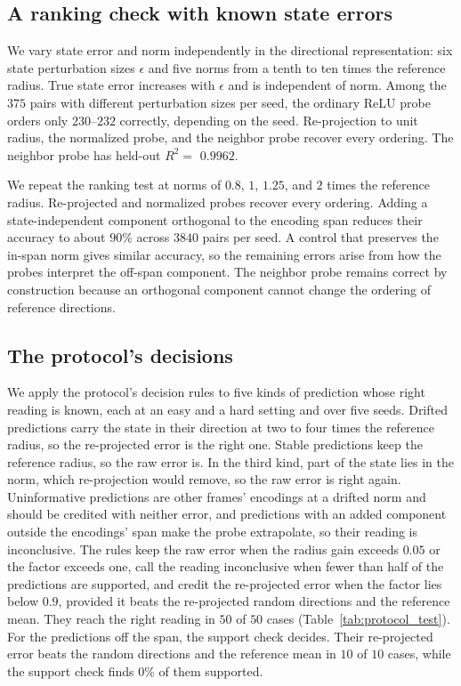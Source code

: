 \subsection{A ranking check with known state errors}
\label{app:synthetic_ranking}
We vary state error and norm independently in the directional representation: six state perturbation sizes $\epsilon$ and five norms from a tenth to ten times the reference radius. True state error increases with $\epsilon$ and is independent of norm. Among the $375$ pairs with different perturbation sizes per seed, the ordinary ReLU probe orders only $230$--$232$ correctly, depending on the seed. Re-projection to unit radius, the normalized probe, and the neighbor probe recover every ordering. The neighbor probe has held-out $R^2=$ $0.9962$.

We repeat the ranking test at norms of $0.8$, $1$, $1.25$, and $2$ times the reference radius. Re-projected and normalized probes recover every ordering. Adding a state-independent component orthogonal to the encoding span reduces their accuracy to about $90$\% across $3840$ pairs per seed. A control that preserves the in-span norm gives similar accuracy, so the remaining errors arise from how the probes interpret the off-span component. The neighbor probe remains correct by construction because an orthogonal component cannot change the ordering of reference directions.

\subsection{The protocol's decisions}
\label{app:protocol_test}
We apply the protocol's decision rules to five kinds of prediction whose right reading is known, each at an easy and a hard setting and over five seeds. Drifted predictions carry the state in their direction at two to four times the reference radius, so the re-projected error is the right one. Stable predictions keep the reference radius, so the raw error is. In the third kind, part of the state lies in the norm, which re-projection would remove, so the raw error is right again. Uninformative predictions are other frames' encodings at a drifted norm and should be credited with neither error, and predictions with an added component outside the encodings' span make the probe extrapolate, so their reading is inconclusive. The rules keep the raw error when the radius gain exceeds $0.05$ or the factor exceeds one, call the reading inconclusive when fewer than half of the predictions are supported, and credit the re-projected error when the factor lies below $0.9$, provided it beats the re-projected random directions and the reference mean. They reach the right reading in $50$ of $50$ cases (Table~\ref{tab:protocol_test}). For the predictions off the span, the support check decides. Their re-projected error beats the random directions and the reference mean in $10$ of $10$ cases, while the support check finds $0$\% of them supported.

